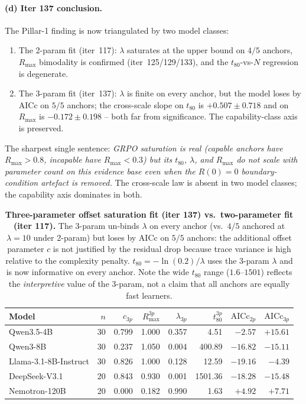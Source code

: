 \documentclass{article}
\begin{document}
\paragraph{(d) Iter 137 conclusion.}
\label{par:scaling-iter137-conclusion}

The Pillar-1 finding is now triangulated by two model classes:
\begin{enumerate}
  \item The 2-param fit (iter~117): $\lambda$ saturates at the
    upper bound on $4/5$ anchors, $R_{\max}$ bimodality is
    confirmed (iter~125/129/133), and the $t_{80}$-vs-$N$
    regression is degenerate.
  \item The 3-param fit (iter~137): $\lambda$ is finite on
    every anchor, but the model loses by AICc on $5/5$ anchors;
    the cross-scale slope on $t_{80}$ is $+0.507 \pm 0.718$ and
    on $R_{\max}$ is $-0.172 \pm 0.198$ -- both far from
    significance.  The capability-class axis is preserved.
\end{enumerate}
The sharpest single sentence: \emph{GRPO saturation is real
(capable anchors have $R_{\max} > 0.8$, incapable have
$R_{\max} < 0.3$) but its $t_{80}$, $\lambda$, and $R_{\max}$
do not scale with parameter count on this evidence base even
when the $R(0)=0$ boundary-condition artefact is removed.}
The cross-scale law is absent in two model classes; the
capability axis dominates in both.

\begin{table}[t]
  \centering
  \small
  \begin{tabular}{lrrrrrrr}
    \toprule
    Model & $n$ & $c_{3p}$ & $R_{\max}^{3p}$ & $\lambda_{3p}$ &
           $t_{80}^{3p}$ & $\mathrm{AICc}_{2p}$ & $\mathrm{AICc}_{3p}$ \\
    \midrule
    Qwen3.5-4B             & 30 & 0.799 & 1.000 & 0.357  &   4.51  &  $-2.57$  &  $+15.61$  \\
    Qwen3-8B               & 30 & 0.237 & 1.050 & 0.004  & 400.89  & $-16.82$  & $-15.11$  \\
    Llama-3.1-8B-Instruct  & 30 & 0.826 & 1.000 & 0.128  &  12.59  & $-19.16$  &  $-4.39$  \\
    DeepSeek-V3.1          & 20 & 0.843 & 0.930 & 0.001  & 1501.36 & $-18.28$  & $-15.48$  \\
    Nemotron-120B          & 20 & 0.000 & 0.182 & 0.990  &   1.63  &  $+4.92$  &  $+7.71$  \\
    \bottomrule
  \end{tabular}
  \caption{\textbf{Three-parameter offset saturation fit
    (iter 137) vs.\ two-parameter fit (iter 117).}  The
    3-param un-binds $\lambda$ on every anchor (vs.\ $4/5$
    anchored at $\lambda=10$ under 2-param) but loses by
    AICc on $5/5$ anchors: the additional offset parameter
    $c$ is not justified by the residual drop because trace
    variance is high relative to the complexity penalty.
    $t_{80} = -\ln(0.2)/\lambda$ uses the 3-param $\lambda$
    and is now informative on every anchor.  Note the wide
    $t_{80}$ range ($1.6$--$1501$) reflects the
    \emph{interpretive} value of the 3-param, not a claim
    that all anchors are equally fast learners.}
  \label{tab:scaling-iter137-fits}
\end{table}
\end{document}
